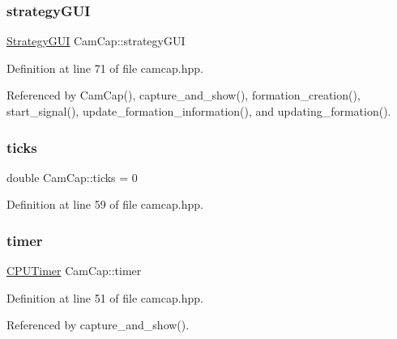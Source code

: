 \mbox{\label{class_cam_cap_a71ae899fee6c1b02de3c373965208e52}} 
\subsubsection{\texorpdfstring{strategy\+G\+UI}{strategyGUI}}
{\footnotesize\ttfamily \hyperlink{class_strategy_g_u_i}{Strategy\+G\+UI} Cam\+Cap\+::strategy\+G\+UI}



Definition at line 71 of file camcap.\+hpp.



Referenced by Cam\+Cap(), capture\+\_\+and\+\_\+show(), formation\+\_\+creation(), start\+\_\+signal(), update\+\_\+formation\+\_\+information(), and updating\+\_\+formation().

\mbox{\label{class_cam_cap_adfc9cd012ff6fa67497ffb0d32eb634e}} 
\subsubsection{\texorpdfstring{ticks}{ticks}}
{\footnotesize\ttfamily double Cam\+Cap\+::ticks = 0}



Definition at line 59 of file camcap.\+hpp.

\mbox{\label{class_cam_cap_a2ea4ba1566017370f13057ec3d8b43ff}} 
\subsubsection{\texorpdfstring{timer}{timer}}
{\footnotesize\ttfamily \hyperlink{class_c_p_u_timer}{C\+P\+U\+Timer} Cam\+Cap\+::timer}



Definition at line 51 of file camcap.\+hpp.



Referenced by capture\+\_\+and\+\_\+show().

\mbox{\label{class_cam_cap_a074219feeb2cc1531246f45d8244ed0c}} 
